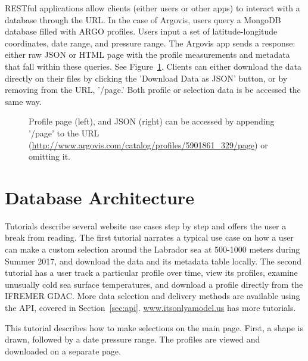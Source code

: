 RESTful applications allow clients (either users or other apps) to interact with a database through the URL. In the case of Argovis, users query a MongoDB database filled with ARGO profiles. Users input a set of latitude-longitude coordinates, date range, and pressure range. The Argovis app sends a response: either raw JSON or HTML page with the profile measurements and metadata that fall within these queries. See Figure~\ref{fig:profile_data}. Clients can either download the data directly on their files by clicking the 'Download Data as JSON' button, or by removing from the URL, '/page.' Both profile or selection data is be accessed the same way.

\begin{figure}[H]
\begin{minipage}{6in}
\centering
{}
\caption{\label{fig:profile_data} Profile page (left), and JSON (right) can be accessed by appending '/page' to the URL (\url{http://www.argovis.com/catalog/profiles/5901861_329/page}) or omitting it.}
\end{minipage}
\end{figure}

\section{Database Architecture}

Tutorials describe several website use cases step by step and offers the user a break from reading. The first tutorial narrates a typical use case on how a user can make a custom selection around the Labrador sea at 500-1000 meters during Summer 2017, and download the data and its metadata table locally. The second tutorial has a user track a particular profile over time, view its profiles, examine unusually cold sea surface temperatures, and download a profile directly from the IFREMER GDAC. More data selection and delivery methods are available using the API, covered in Section~\ref{sec:api}. \url{www.itsonlyamodel.us} has more tutorials.



This tutorial describes how to make selections on the main page. First, a shape is drawn, followed by a date pressure range. The profiles are viewed and downloaded on a separate page.

